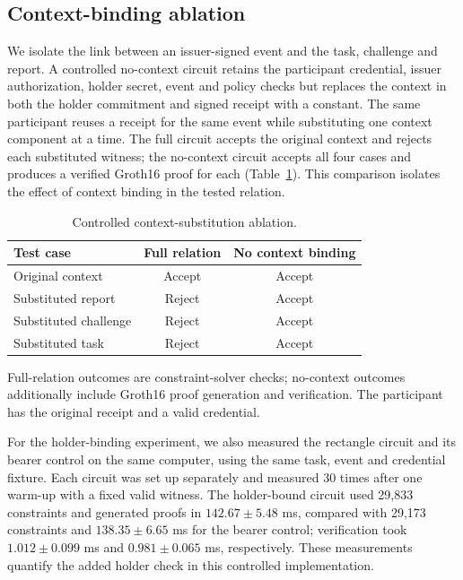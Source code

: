 \documentclass[pdflatex,iicol,sn-mathphys-num]{sn-jnl}
\begin{document}
\subsection{Context-binding ablation}
We isolate the link between an issuer-signed event and the task, challenge and report. A controlled no-context circuit retains the participant credential, issuer authorization, holder secret, event and policy checks but replaces the context in both the holder commitment and signed receipt with a constant. The same participant reuses a receipt for the same event while substituting one context component at a time. The full circuit accepts the original context and rejects each substituted witness; the no-context circuit accepts all four cases and produces a verified Groth16 proof for each (Table~\ref{tab:context-ablation}). This comparison isolates the effect of context binding in the tested relation.

\begin{table}[t]
\centering\footnotesize\setlength{\tabcolsep}{3pt}\caption{Controlled context-substitution ablation.}\label{tab:context-ablation}
\begin{tabular}{@{}lcc@{}}\toprule
Test case & Full relation & No context binding \\\midrule
Original context & Accept & Accept \\
Substituted report & Reject & Accept \\
Substituted challenge & Reject & Accept \\
Substituted task & Reject & Accept \\\bottomrule
\end{tabular}\par\vspace{2pt}
\footnotesize Full-relation outcomes are constraint-solver checks; no-context outcomes additionally include Groth16 proof generation and verification. The participant has the original receipt and a valid credential.
\end{table}

For the holder-binding experiment, we also measured the rectangle circuit and its bearer control on the same computer, using the same task, event and credential fixture. Each circuit was set up separately and measured 30 times after one warm-up with a fixed valid witness. The holder-bound circuit used 29,833 constraints and generated proofs in $142.67\pm5.48$ ms, compared with 29,173 constraints and $138.35\pm6.65$ ms for the bearer control; verification took $1.012\pm0.099$ ms and $0.981\pm0.065$ ms, respectively. These measurements quantify the added holder check in this controlled implementation.
\end{document}
